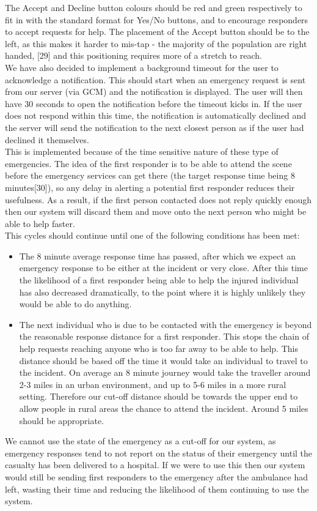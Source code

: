 \documentclass{article}
\begin{document}
The Accept and Decline button colours should be red and green respectively to fit in with the standard format for Yes/No buttons, and to encourage responders to accept requests for help. The placement of the Accept button should be to the left, as this makes it harder to mis-tap - the majority of the population are right handed, [29] and this positioning requires more of a stretch to reach.\\

We have also decided to implement a background timeout for the user to acknowledge a notification. This should start when an emergency request is sent from our server (via GCM) and the notification is displayed. The user will then have 30 seconds to open the notification before the timeout kicks in. If the user does not respond within this time, the notification is automatically declined and the server will send the notification to the next closest person as if the user had declined it themselves.\\

This is implemented because of the time sensitive nature of these type of emergencies. The idea of the first responder is to be able to attend the scene before the emergency services can get there (the target response time being 8 minutes[30]), so any delay in alerting a potential first responder reduces their usefulness. As a result, if the first person contacted does not reply quickly enough then our system will discard them and move onto the next person who might be able to help faster.\\

This cycles should continue until one of the following conditions has been met:
\begin{itemize}
\item The 8 minute average response time has passed, after which we expect an emergency response to be either at the incident or very close. After this time the likelihood of a first responder being able to help the injured individual has also decreased dramatically, to the point where it is highly unlikely they would be able to do anything.
\item The next individual who is due to be contacted with the emergency is beyond the reasonable response distance for a first responder. This stops the chain of help requests reaching anyone who is too far away to be able to help. This distance should be based off the time it would take an individual to travel to the incident. On average an 8 minute journey would take the traveller around 2-3 miles in an urban environment, and up to 5-6 miles in a more rural setting. Therefore our cut-off distance should be towards the upper end to allow people in rural areas the chance to attend the incident. Around 5 miles should be appropriate.
\end{itemize}
We cannot use the state of the emergency as a cut-off for our system, as emergency responses tend to not report on the status of their emergency until the casualty has been delivered to a hospital. If we were to use this then our system would still be sending first responders to the emergency after the ambulance had left, wasting their time and reducing the likelihood of them continuing to use the system.\\
\end{document}
